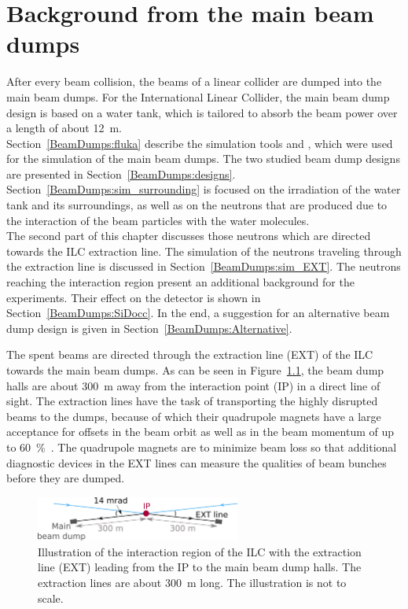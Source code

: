 \chapter{Background from the main beam dumps}
\label{BeamDumps}

\begin{chapterabstract}
 After every beam collision, the beams of a linear collider are dumped into the main beam dumps.
 For the International Linear Collider, the main beam dump design is based on a water tank, which is tailored to absorb the beam power over a length of about \SI[detect-all]{12}{\meter}.
 \\Section~\ref{BeamDumps:fluka} describe the simulation tools \fluka and \flair, which were used for the simulation of the main beam dumps.
 The two studied beam dump designs are presented in Section~\ref{BeamDumps:designs}.
 Section~\ref{BeamDumps:sim_surrounding} is focused on the irradiation of the water tank and its surroundings, as well as on the neutrons that are produced due to the interaction of the beam particles with the water molecules.
 \\The second part of this chapter discusses those neutrons which are directed towards the ILC extraction line.
 The simulation of the neutrons traveling through the extraction line is discussed in Section~\ref{BeamDumps:sim_EXT}.
 The neutrons reaching the interaction region present an additional background for the experiments.
 Their effect on the \sid detector is shown in Section~\ref{BeamDumps:SiDocc}.
 In the end, a suggestion for an alternative beam dump design is given in Section~\ref{BeamDumps:Alternative}.
\end{chapterabstract}
\vspace*{0.5cm}\newline
\noindent
The spent \positron\electron beams are directed through the extraction line (EXT) of the ILC towards the main beam dumps. 
As can be seen in Figure~\ref{fig:BeamDumps:IP_to_Dump}, the beam dump halls are about \SI{300}{\meter} away from the interaction point (IP) in a direct line of sight.
The extraction lines have the task of transporting the highly disrupted beams to the dumps, because of which their quadrupole magnets have a large acceptance for offsets in the beam orbit as well as in the beam momentum of up to \SI{60}{\percent}~\cite[p. 139]{TDR32}.
The quadrupole magnets are to minimize beam loss so that additional diagnostic devices in the EXT lines can measure the qualities of beam bunches before they are dumped.
\begin{figure}
\centering
\includegraphics[width=0.6\textwidth]{Figures/BeamDump/IP_EXT.png}
\caption[Schematic of the ILC interaction region with extraction line]{Illustration of the interaction region of the ILC with the extraction line (EXT) leading from the IP to the main beam dump halls.
The extraction lines are about \SI[detect-all]{300}{\meter} long.
The illustration is not to scale.}
\label{fig:BeamDumps:IP_to_Dump}
\end{figure}

